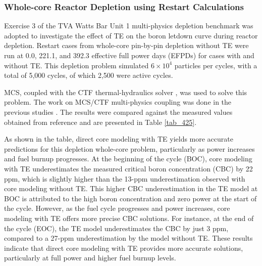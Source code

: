 \subsubsection{Whole-core Reactor Depletion using Restart Calculations}

Exercise 3 of the TVA Watts Bar Unit 1 multi-physics depletion benchmark \cite{albagami} was adopted to investigate the effect of TE on the boron letdown curve during reactor depletion. Restart cases from whole-core pin-by-pin depletion without TE were run at 0.0, 221.1, and 392.3 effective full power days (EFPDs) for cases with and without TE. This depletion problem simulated $6\times10^4$ particles per cycles, with a total of 5,000 cycles, of which 2,500 were active cycles.

MCS, coupled with the CTF thermal-hydraulics solver \cite{salko}, was used to solve this problem. The work on MCS/CTF multi-physics coupling was done in the previous studies \cite{yu_2017}. The results were compared against the measured values obtained from reference \cite{godfrey} and are presented in Table \ref{tab_425}.

As shown in the table, direct core modeling with TE yields more accurate predictions for this depletion whole-core problem, particularly as power increases and fuel burnup progresses. At the beginning of the cycle (BOC), core modeling with TE underestimates the measured critical boron concentration (CBC) by 22 ppm, which is slightly higher than the 13-ppm underestimation observed with core modeling without TE. This higher CBC underestimation in the TE model at BOC is attributed to the high boron concentration and zero power at the start of the cycle. However, as the fuel cycle progresses and power increases, core modeling with TE offers more precise CBC solutions. For instance, at the end of the cycle (EOC), the TE model underestimates the CBC by just 3 ppm, compared to a 27-ppm underestimation by the model without TE. These results indicate that direct core modeling with TE provides more accurate solutions, particularly at full power and higher fuel burnup levels.

